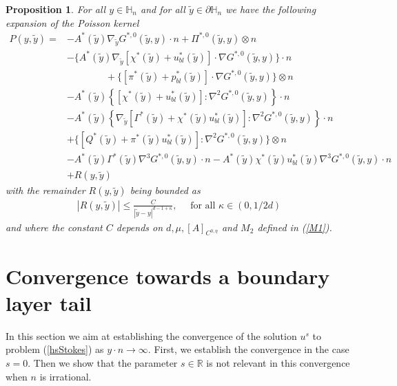 \documentclass[11pt, reqno]{amsart}
\newtheorem{proposition}[theorem]{Proposition}
\theoremstyle{definition}
\theoremstyle{remark}
\numberwithin{equation}{section}
\begin{document}
	\begin{proposition}\label{propoexpansp_poisson}
		For all $y\in \mathbb{H}_n$ and for all $\tilde{y}\in \partial\mathbb{H}_n$ we have the following expansion of the Poisson kernel
		\begin{align}
			P(y,\tilde{y})=&-A^*(\tilde{y}) \nabla_{\!\tilde{y}}G^{*,0} \left(\tilde{y},y \right)\cdot n+ \Pi^{*,0}( \tilde{y}, y)\otimes n\nonumber\\&-\{A^*(\tilde{y}) \nabla_{\!\tilde{y}}\left[\chi^* \left(\tilde{y} \right)+ u_{bl}^*\left(\tilde{y} \right)\right] \cdot \nabla G^{*,0}\left(\tilde{y},y\right)\}\cdot n\nonumber\\
			&\qquad \qquad + \{ [\pi^*(\tilde{y})+p_{bl}^*(\tilde{y})] \cdot \nabla G^{*,0}(\tilde{y}, y)\}\otimes n \nonumber\\
			&-A^*(\tilde{y}) \left\{ \left[\chi^* \left(\tilde{y} \right)+ u_{bl}^*\left(\tilde{y} \right)\right]:\nabla^2 G^{*,0}\left(\tilde{y},y\right) \right\}\cdot n\label{expans_P}\\
			&-A^*(\tilde{y})\left\{  \nabla_{\!\tilde{y}}[\Gamma^* (\tilde{y})+\chi^*\left(\tilde{y} \right) u_{bl}^*(\tilde{y} )]:\nabla^2 G^{*,0}\left(\tilde{y},y \right) 	\right\}\cdot n\nonumber\\
			&+ \{[Q^*(\tilde{y})+\pi^* (\tilde{y})u_{bl}^*(\tilde{y})]:\nabla^2 G^{*,0}(\tilde{y}, y)\}\otimes n\nonumber \\
			& -A^*(\tilde{y})  \Gamma^*(\tilde{y}) \nabla^3 G^{*,0} (\tilde{y},y)\cdot n-A^*(\tilde{y})    \chi^* (\tilde{y})u_{bl}^*(\tilde{y}) \nabla^3 G^{*,0} (\tilde{y},y)\cdot n\nonumber\\
			&+R(y,\tilde{y})\nonumber
		\end{align}
		with  the remainder $R(y,\tilde{y})$ being bounded as
		\begin{align}
			| R(y,\tilde{y})|\leq \frac{C}{|\tilde{y}-y|^{d-1+\kappa}},\quad \mbox{ for all } \kappa\in (0,1/2d)\label{bound_remainder}
		\end{align}and where the constant $C$ depends on $ d, \mu, [A]_{C^{0,\eta}}$ and $M_2$ defined in \textup{(\ref{M1})}.
	\end{proposition}
	
	\section{Convergence towards a boundary layer tail}\label{section_converge}
	\noindent In this section we aim at establishing the convergence of the solution $u^s$ to problem (\ref{hsStokes}) as $y\cdot n \rightarrow \infty$. First, we establish the convergence in the case $s=0$. Then we show that the parameter $s\in\mathbb{R}$ is not relevant in this convergence when $n$ is irrational.
\end{document}
